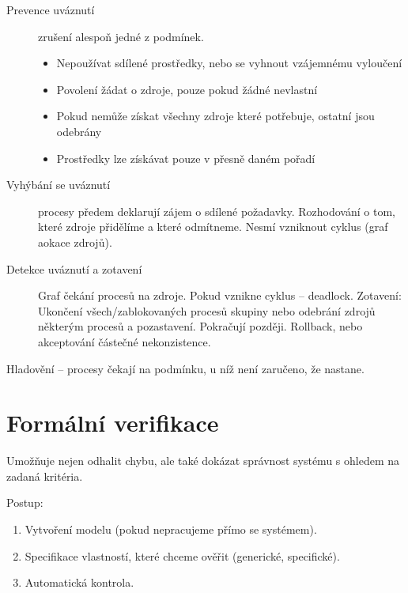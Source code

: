 \documentclass[a4wide]{report}
\begin{document}
\begin{description}
	\item[Prevence uváznutí] zrušení alespoň jedné z podmínek.
	\begin{itemize}
		\item Nepoužívat sdílené prostředky, nebo se vyhnout vzájemnému vyloučení
		\item Povolení žádat o zdroje, pouze pokud žádné nevlastní
		\item Pokud nemůže získat všechny zdroje které potřebuje, ostatní jsou odebrány
		\item Prostředky lze získávat pouze v přesně daném pořadí
	\end{itemize}

	\item[Vyhýbání se uváznutí] procesy předem deklarují zájem o sdílené požadavky. Rozhodování o tom, které zdroje přidělíme a které odmítneme. Nesmí vzniknout cyklus (graf aokace zdrojů).
	\item[Detekce uváznutí a zotavení] Graf čekání procesů na zdroje. Pokud vznikne cyklus -- deadlock. Zotavení: Ukončení všech/zablokovaných procesů skupiny nebo odebrání zdrojů některým procesů a pozastavení. Pokračují později. Rollback, nebo akceptování částečné nekonzistence.
\end{description}

Hladovění -- procesy čekají na podmínku, u níž není zaručeno, že nastane.

\section{Formální verifikace}
Umožňuje nejen odhalit chybu, ale také dokázat správnost systému s ohledem na zadaná kritéria.

Postup:
\begin{enumerate}
	\item Vytvoření modelu (pokud nepracujeme přímo se systémem).
	\item Specifikace vlastností, které chceme ověřit (generické, specifické).
	\item Automatická kontrola.
\end{enumerate}
\end{document}
